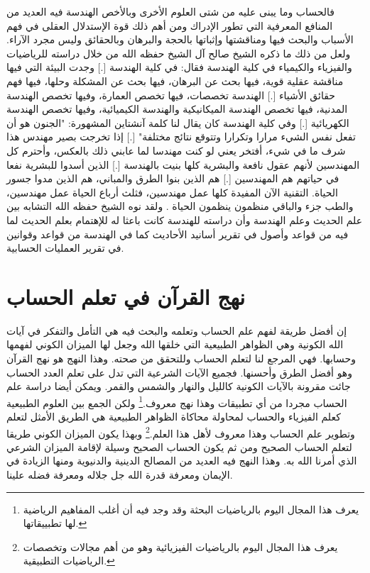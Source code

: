فالحساب وما يبنى عليه من شتى العلوم الأخرى وبالأخص الهندسة فيه العديد من المنافع المعرفية التي تطور الإدراك ومن أهم ذلك قوة الإستدلال العقلى في فهم الأسباب والبحث فيها ومناقشتها وإثباتها بالحجة والبرهان وبالحقائق وليس مجرد الآراء. ولعل من ذلك ما ذكره الشيخ صالح آل الشيخ حفظه الله من خلال دراسته للرياضيات والفيزياء والكيمياء في كلية الهندسة فقال: في كلية الهندسة [.] وجدت البيئة التي فيها مناقشة عقلية قوية، فيها بحث عن البرهان، فيها بحث عن المشكلة وحلها، فيها فهم حقائق الأشياء [.] الهندسة تخصصات، فيها تخصص العمارة، وفيها تخصص الهندسة المدنية، فيها تخصص الهندسة الميكانيكية والهندسة الكيميائية، وفيها تخصص الهندسة الكهريائية [.] وفي كلية الهندسة كان يقال لنا كلمة آنشتاين المشهورة: "الجنون هو أن تفعل نفس الشيء مرارا وتكرارا وتتوقع نتائج مختلفة" [.] إذا تخرجت بصير مهندس هذا شرف ما في شيء، أفتخر يعني لو كنت مهندسا لما عابني ذلك بالعكس، وأحترم كل المهندسين لأنهم عقول نافعة والبشرية كلها بنيت بالهندسة [.] الذين أسدوا للبشرية نفعا في حياتهم هم المهندسين [.] هم الذين بنوا الطرق والمباني، هم الذين مدوا جسور الحياة. التقنية الآن المفيدة كلها عمل مهندسين، فثلث أرباع الحياة عمل مهندسين، والطب جزء والباقي منظمون ينظمون الحياة \href{https://www.youtube.com/watch?v=kw_s0K_zbqc}{\faExternalLink}. ولقد نوه الشيخ حفظه الله التشابه بين علم الحديث وعلم الهندسة وأن دراسته للهندسة كانت باعثا له للإهتمام بعلم الحديث لما فيه من قواعد وأصول في تقرير أسانيد الأحاديث كما في الهندسة من قواعد وقوانين في تقرير العمليات الحسابية.

\section{نهج القرآن في تعلم الحساب}

إن أفضل طريقة لفهم علم الحساب وتعلمه والبحث فيه هي التأمل والتفكر في آيات الله الكونية وهي الظواهر الطبيعية التي خلقها الله وجعل لها الميزان الكوني لفهمها وحسابها. فهي المرجع لنا لتعلم الحساب وللتحقق من صحته. وهذا النهج هو نهج القرآن وهو أفضل الطرق وأحسنها. فجميع الآيات الشرعية التي تدل على تعلم العدد الحساب جائت مقرونة بالآيات الكونية كالليل والنهار والشمس والقمر. ويمكن أيضا دراسة علم الحساب مجردا من أي تطبيقات وهذا نهج معروف.\footnote{يعرف هذا المجال اليوم بالرياضيات البحثة وقد وجد فيه أن أغلب المفاهيم الرياضية لها تطبييقاتها.} ولكن الجمع بين العلوم الطبيعية كعلم الفيزياء والحساب لمحاولة محاكاة الظواهر الطبيعية هي الطريق الأمثل لتعلم وتطوير علم الحساب وهذا معروف لأهل هذا العلم.\footnote{يعرف هذا المجال اليوم بالرياضيات الفيزيائية وهو من أهم مجالات وتخصصات الرياضيات التطبيقية.} وبهذا يكون الميزان الكوني طريقا لتعلم الحساب الصحيح ومن ثم يكون الحساب الصحيح وسيلة لإقامة الميزان الشرعي الذي أمرنا الله به. وهذا النهج فيه العديد من المصالح الدينية والدنيوية ومنها الزيادة في الإيمان ومعرفة قدرة الله جل جلاله ومعرفة فضله علينا.

